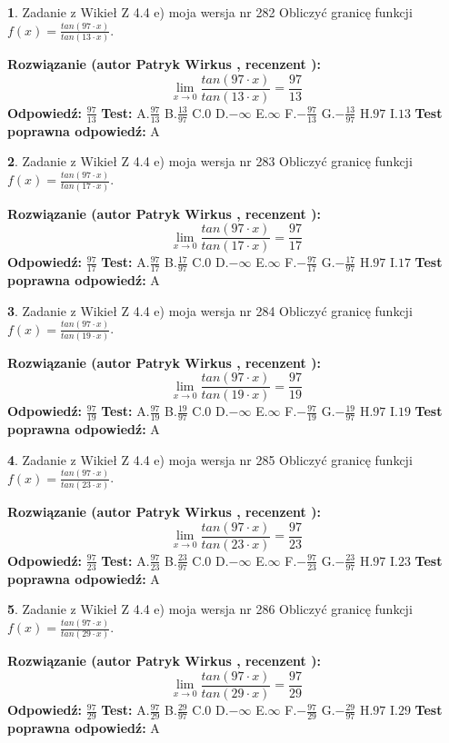 \documentclass[12pt, a4paper]{article}
\theoremstyle{definition} %
\newtheorem{zad}{}
\newcommand{\zadStart}[1]{\begin{zad}#1\newline}
\newcommand{\zadStop}{\end{zad}}
\newcommand{\rozwStart}[2]{\noindent \textbf{Rozwiązanie (autor #1 , recenzent #2): }\newline}
\newcommand{\rozwStop}{\newline}
\newcommand{\odpStart}{\noindent \textbf{Odpowiedź:}\newline}
\newcommand{\odpStop}{\newline}
\newcommand{\testStart}{\noindent \textbf{Test:}\newline}
\newcommand{\testStop}{\newline}
\newcommand{\kluczStart}{\noindent \textbf{Test poprawna odpowiedź:}\newline}
\newcommand{\kluczStop}{\newline}
\begin{document}
\zadStart{Zadanie z Wikieł Z 4.4 e) moja wersja nr 282}
Obliczyć granicę funkcji $f(x)=\frac{tan(97\cdot x)}{tan(13\cdot x)}$.
\zadStop
\rozwStart{Patryk Wirkus}{}
$$\lim\limits_{x\to 0}\frac{tan(97\cdot x)}{tan(13\cdot x)}=
\frac{97}{13}$$
\rozwStop
\odpStart
$\frac{97}{13}$
\odpStop
\testStart
A.$\frac{97}{13}$
B.$\frac{13}{97}$
C.$0$
D.$-\infty$
E.$\infty$
F.$-\frac{97}{13}$
G.$-\frac{13}{97}$
H.$97$
I.$13$
\testStop
\kluczStart
A
\kluczStop



\zadStart{Zadanie z Wikieł Z 4.4 e) moja wersja nr 283}
Obliczyć granicę funkcji $f(x)=\frac{tan(97\cdot x)}{tan(17\cdot x)}$.
\zadStop
\rozwStart{Patryk Wirkus}{}
$$\lim\limits_{x\to 0}\frac{tan(97\cdot x)}{tan(17\cdot x)}=
\frac{97}{17}$$
\rozwStop
\odpStart
$\frac{97}{17}$
\odpStop
\testStart
A.$\frac{97}{17}$
B.$\frac{17}{97}$
C.$0$
D.$-\infty$
E.$\infty$
F.$-\frac{97}{17}$
G.$-\frac{17}{97}$
H.$97$
I.$17$
\testStop
\kluczStart
A
\kluczStop



\zadStart{Zadanie z Wikieł Z 4.4 e) moja wersja nr 284}
Obliczyć granicę funkcji $f(x)=\frac{tan(97\cdot x)}{tan(19\cdot x)}$.
\zadStop
\rozwStart{Patryk Wirkus}{}
$$\lim\limits_{x\to 0}\frac{tan(97\cdot x)}{tan(19\cdot x)}=
\frac{97}{19}$$
\rozwStop
\odpStart
$\frac{97}{19}$
\odpStop
\testStart
A.$\frac{97}{19}$
B.$\frac{19}{97}$
C.$0$
D.$-\infty$
E.$\infty$
F.$-\frac{97}{19}$
G.$-\frac{19}{97}$
H.$97$
I.$19$
\testStop
\kluczStart
A
\kluczStop



\zadStart{Zadanie z Wikieł Z 4.4 e) moja wersja nr 285}
Obliczyć granicę funkcji $f(x)=\frac{tan(97\cdot x)}{tan(23\cdot x)}$.
\zadStop
\rozwStart{Patryk Wirkus}{}
$$\lim\limits_{x\to 0}\frac{tan(97\cdot x)}{tan(23\cdot x)}=
\frac{97}{23}$$
\rozwStop
\odpStart
$\frac{97}{23}$
\odpStop
\testStart
A.$\frac{97}{23}$
B.$\frac{23}{97}$
C.$0$
D.$-\infty$
E.$\infty$
F.$-\frac{97}{23}$
G.$-\frac{23}{97}$
H.$97$
I.$23$
\testStop
\kluczStart
A
\kluczStop



\zadStart{Zadanie z Wikieł Z 4.4 e) moja wersja nr 286}
Obliczyć granicę funkcji $f(x)=\frac{tan(97\cdot x)}{tan(29\cdot x)}$.
\zadStop
\rozwStart{Patryk Wirkus}{}
$$\lim\limits_{x\to 0}\frac{tan(97\cdot x)}{tan(29\cdot x)}=
\frac{97}{29}$$
\rozwStop
\odpStart
$\frac{97}{29}$
\odpStop
\testStart
A.$\frac{97}{29}$
B.$\frac{29}{97}$
C.$0$
D.$-\infty$
E.$\infty$
F.$-\frac{97}{29}$
G.$-\frac{29}{97}$
H.$97$
I.$29$
\testStop
\kluczStart
A
\kluczStop
\end{document}
